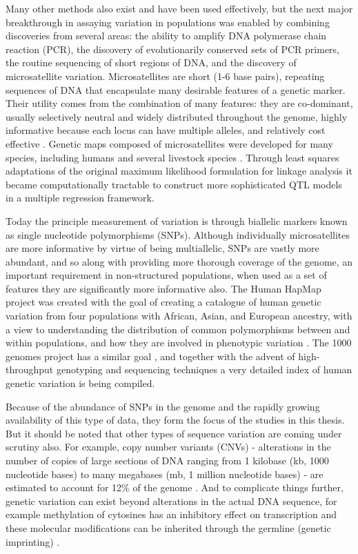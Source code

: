 Many other methods also exist and have been used effectively, but the next major breakthrough in assaying variation in populations was enabled by combining discoveries from several areas: the ability to amplify DNA polymerase chain reaction (PCR), the discovery of evolutionarily conserved sets of PCR primers, the routine sequencing of short regions of DNA, and the discovery of microsatellite variation. Microsatellites are short (1-6 base pairs), repeating sequences of DNA that encapsulate many desirable features of a genetic marker. Their utility comes from the combination of many features: they are co-dominant, usually selectively neutral and widely distributed throughout the genome, highly informative because each locus can have multiple alleles, and relatively cost effective \citep{Jarne1996, Sunnucks2000}. Genetic maps composed of microsatellites were developed for many species, including humans \citep{Weissenbach1993} and several livestock species \citep{Womack1993, Rohrer1994, Groenen1998}. Through least squares adaptations \citep{Haley1992, Haley1994} of the original maximum likelihood formulation for linkage analysis \citep{Lander1989} it became computationally tractable to construct more sophisticated QTL models in a multiple regression framework.

Today the principle measurement of variation is through biallelic markers known as single nucleotide polymorphisms (SNPs). Although individually microsatellites are more informative by virtue of being multiallelic, SNPs are vastly more abundant, and so along with providing more thorough coverage of the genome, an important requirement in non-structured populations, when used as a set of features they are significantly more informative also. The Human HapMap project was created with the goal of creating a catalogue of human genetic variation from four populations with African, Asian, and European ancestry, with a view to understanding the distribution of common polymorphisms between and within populations, and how they are involved in phenotypic variation \citep{TheInternationalHapmapConsortium2005}. The 1000 genomes project has a similar goal \citep{Durbin2010}, and together with the advent of high-throughput genotyping and sequencing techniques a very detailed index of human genetic variation is being compiled.

Because of the abundance of SNPs in the genome and the rapidly growing availability of this type of data, they form the focus of the studies in this thesis. But it should be noted that other types of sequence variation are coming under scrutiny also. For example, copy number variants (CNVs) - alterations in the number of copies of large sections of DNA ranging from 1 kilobase (kb, 1000 nucleotide bases) to many megabases (mb, 1 million nucleotide bases) - are estimated to account for 12\% of the genome \citep{Armengol2009, McCarroll2010}. And to complicate things further, genetic variation can exist beyond alterations in the actual DNA sequence, for example methylation of cytosines has an inhibitory effect on transcription and these molecular modifications can be inherited through the germline (genetic imprinting) \citep{Petronis2010, Heard2010, Danchin2011}.

